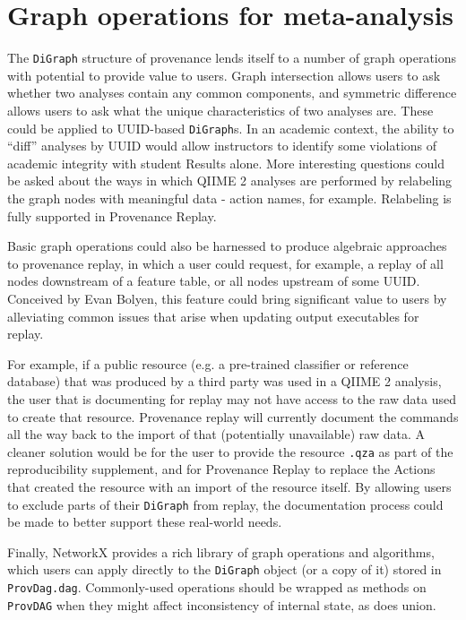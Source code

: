 \section{Graph operations for meta-analysis \parencite[Issue 30]{keefe_issues_2021}}
\label{section:graph_ops}

The \texttt{DiGraph} structure of provenance lends itself to a number of graph operations
with potential to provide value to users. Graph intersection allows users to ask
whether two analyses contain any common components, and symmetric difference
allows users to ask what the unique characteristics of two analyses are. These
could be applied to UUID-based \texttt{DiGraph}s. In an academic context, the ability to
“diff” analyses by UUID would allow instructors to identify some violations of
academic integrity with student Results alone. More interesting questions could
be asked about the ways in which QIIME 2 analyses are performed by relabeling
the graph nodes with meaningful data - action names, for example. Relabeling is
fully supported in Provenance Replay.

Basic graph operations could also be harnessed to produce algebraic approaches
to provenance replay, in which a user could request, for example, a replay of
all nodes downstream of a feature table, or all nodes upstream of some UUID.
Conceived by Evan Bolyen, this feature could bring significant value to users by
alleviating common issues that arise when updating output executables for
replay.

For example, if a public resource (e.g. a pre-trained classifier or reference
database) that was produced by a third party was used in a QIIME 2 analysis, the
user that is documenting for replay may not have access to the raw data used to
create that resource. Provenance replay will currently document the commands all
the way back to the import of that (potentially unavailable) raw data. A cleaner
solution would be for the user to provide the resource \texttt{.qza} as part of the
reproducibility supplement, and for Provenance Replay to replace the Actions
that created the resource with an import of the resource itself. By allowing
users to exclude parts of their \texttt{DiGraph} from replay, the documentation process
could be made to better support these real-world needs.

Finally, NetworkX provides a rich library of graph operations and algorithms,
which users can apply directly to the \texttt{DiGraph} object (or a copy of it) stored in
\texttt{ProvDag.dag}. Commonly-used operations should be wrapped as methods on
\texttt{ProvDAG} when they might affect inconsistency of internal state, as does union.

